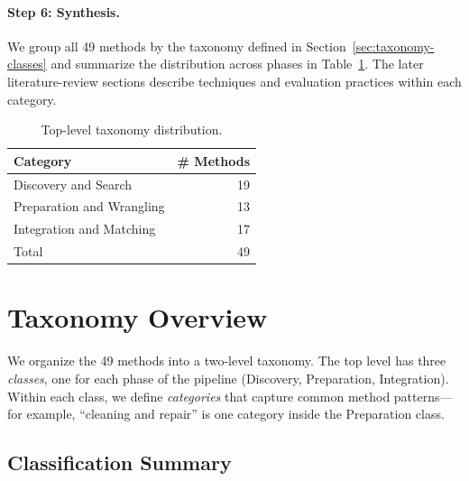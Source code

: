 \documentclass[sigconf,nonacm]{acmart}
\newcommand{\tbl}{%
  \scriptsize
  \setlength{\tabcolsep}{4pt}%
  \renewcommand{\arraystretch}{1.12}%
}
\begin{document}
\paragraph{Step 6: Synthesis.}
We group all 49 methods by the taxonomy defined in Section~\ref{sec:taxonomy-classes} and summarize the distribution across phases in Table~\ref{tab:taxonomy-summary}. The later literature-review sections describe techniques and evaluation practices within each category.

\begin{table}[!htbp]
  \caption{Top-level taxonomy distribution.}
  \label{tab:taxonomy-summary}
  \centering
  \tbl
  \begin{tabular}{lr}
    \toprule
    Category & \# Methods \\
    \midrule
    Discovery and Search & 19 \\
    Preparation and Wrangling & 13 \\
    Integration and Matching & 17 \\
    \midrule
    Total & 49 \\
    \bottomrule
  \end{tabular}
\end{table}


\section{Taxonomy Overview}

We organize the 49 methods into a two-level taxonomy. The top level has three \emph{classes}, one for each phase of the pipeline (Discovery, Preparation, Integration). Within each class, we define \emph{categories} that capture common method patterns---for example, ``cleaning and repair'' is one category inside the Preparation class.


\subsection{Classification Summary}
\end{document}
